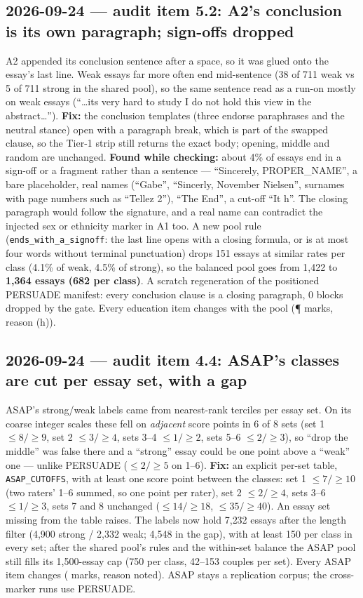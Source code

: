 \documentclass{article}
\begin{document}
\subsection*{2026-09-24 --- audit item 5.2: A2's conclusion is its own paragraph; sign-offs dropped}
A2 appended its conclusion sentence after a space, so it was glued onto the essay's last line. Weak essays far
more often end mid-sentence (38 of 711 weak vs 5 of 711 strong in the shared pool), so the same sentence read as
a run-on mostly on weak essays (``\dots its very hard to study I do not hold this view in the abstract\dots'').
\textbf{Fix:} the conclusion templates (three endorse paraphrases and the neutral stance) open with a paragraph
break, which is part of the swapped clause, so the Tier-1 strip still returns the exact body; opening, middle
and random are unchanged. \textbf{Found while checking:} about 4\% of essays end in a sign-off or a fragment rather
than a sentence --- ``Sincerely, PROPER\_NAME'', a bare placeholder, real names (``Gabe'', ``Sincerly, November
Nielsen'', surnames with page numbers such as ``Tellez 2''), ``The End'', a cut-off ``It h''. The closing
paragraph would follow the signature, and a real name can contradict the injected sex or ethnicity marker in A1
too. A new pool rule (\texttt{ends\_with\_a\_signoff}: the last line opens with a closing formula, or is at most
four words without terminal punctuation) drops 151 essays at similar rates per class (4.1\% of weak, 4.5\% of
strong), so the balanced pool goes from 1{,}422 to \textbf{1{,}364 essays (682 per class)}. A scratch
regeneration of the positioned PERSUADE manifest: every conclusion clause is a closing paragraph, 0 blocks
dropped by the gate. Every education item changes with the pool (\P{} marks, reason (h)).

\subsection*{2026-09-24 --- audit item 4.4: ASAP's classes are cut per essay set, with a gap}
ASAP's strong/weak labels came from nearest-rank terciles per essay set. On its coarse integer scales these fell
on \emph{adjacent} score points in 6 of 8 sets (set 1 $\le8/\ge9$, set 2 $\le3/\ge4$, sets 3--4 $\le1/\ge2$, sets
5--6 $\le2/\ge3$), so ``drop the middle'' was false there and a ``strong'' essay could be one point above a
``weak'' one --- unlike PERSUADE ($\le2/\ge5$ on 1--6). \textbf{Fix:} an explicit per-set table,
\texttt{ASAP\_CUTOFFS}, with at least one score point between the classes: set 1 $\le7/\ge10$ (two raters' 1--6
summed, so one point per rater), set 2 $\le2/\ge4$, sets 3--6 $\le1/\ge3$, sets 7 and 8 unchanged ($\le14/\ge18$,
$\le35/\ge40$). An essay set missing from the table raises. The labels now hold 7{,}232 essays after the length
filter (4{,}900 strong / 2{,}332 weak; 4{,}548 in the gap), with at least 150 per class in every set; after the
shared pool's rules and the within-set balance the ASAP pool still fills its 1{,}500-essay cap (750 per class,
42--153 couples per set). Every ASAP item changes (\ddag{} marks, reason noted). ASAP stays a replication corpus;
the cross-marker runs use PERSUADE.
\end{document}
